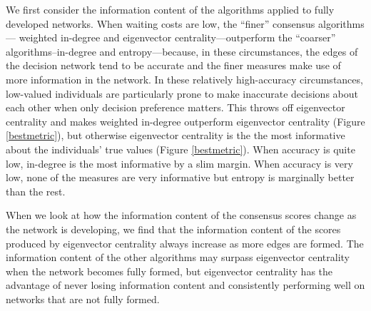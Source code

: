 \documentclass{pnastwo}
\begin{document}
\begin{article}
We first consider the information content of the algorithms applied to fully developed networks. When waiting costs are low, the ``finer'' consensus algorithms--- weighted in-degree and eigenvector centrality---outperform the ``coarser'' algorithms--in-degree and entropy---because, in these circumstances, the edges of the decision network tend to be accurate and the finer measures make use of more information in the network. In these relatively high-accuracy circumstances, low-valued individuals are particularly prone to make inaccurate decisions about each other when only decision preference matters. This  throws off eigenvector centrality and makes weighted in-degree outperform eigenvector centrality (Figure \ref{bestmetric}), but otherwise eigenvector centrality is the the most informative about the individuals' true values (Figure \ref{bestmetric}).  When accuracy is quite low, in-degree is the most informative by a slim margin. When accuracy is very low, none of the measures are very informative but entropy is marginally better than the rest.

When we look at how the information content of the consensus scores change as the network is developing, we find that the information content of the scores produced by eigenvector centrality always increase as more edges are formed. The information content of the other algorithms may surpass eigenvector centrality when the network becomes fully formed, but eigenvector centrality has the advantage of never losing information content and consistently performing well on networks that are not fully formed.



\end{article}
\end{document}
